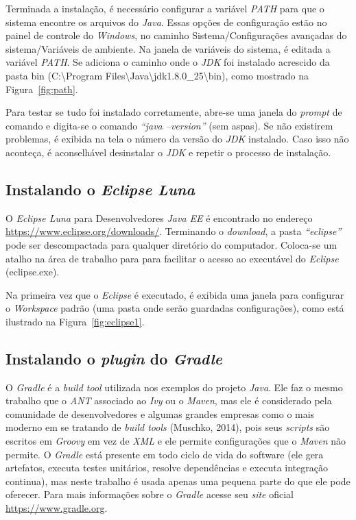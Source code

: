 Terminada a instalação, é necessário configurar a variável \textit{PATH} para que o sistema encontre os arquivos do \textit{Java}. Essas opções de configuração estão no painel de controle do \textit{Windows}, no caminho Sistema/Configurações avançadas do sistema/Variáveis de ambiente. Na janela de variáveis do sistema, é editada a variável \textit{PATH}. Se adiciona o caminho onde o \textit{JDK} foi instalado acrescido da pasta bin (C:\textbackslash Program Files\textbackslash Java\textbackslash jdk\textmd{1.8.0\_25}\textbackslash bin), como mostrado na Figura~\ref{fig:path}.


Para testar se tudo foi instalado corretamente, abre-se uma janela do \textit{prompt} de comando e digita-se o comando \textit{“java –version”} (sem aspas). Se não existirem problemas, é exibida na tela o número da versão do \textit{JDK} instalado. Caso isso não aconteça, é aconselhável desinstalar o \textit{JDK} e repetir o processo de instalação. 

\subsection{Instalando o \textit{Eclipse Luna}} 

O \textit{Eclipse Luna} para Desenvolvedores \textit{Java EE} é encontrado no endereço \url{https://www.eclipse.org/downloads/}. Terminando o \textit{download}, a pasta \textit{“eclipse”} pode ser descompactada para qualquer diretório do computador. Coloca-se um atalho na área de trabalho para  para facilitar o acesso ao executável do \textit{Eclipse} (eclipse.exe).

Na primeira vez que o \textit{Eclipse} é executado, é exibida uma janela para configurar o \textit{Workspace} padrão (uma pasta onde serão guardadas configurações), como está ilustrado na Figura~\ref{fig:eclipse1}.


\subsection{Instalando o \textit{plugin} do \textit{Gradle}} 

O \textit{Gradle} é a \textit{build tool} utilizada nos exemplos do projeto \textit{Java}. Ele faz o mesmo trabalho que o \textit{ANT} associado ao \textit{Ivy} ou o \textit{Maven}, mas ele é considerado pela comunidade de desenvolvedores e algumas grandes empresas como o mais moderno em se tratando de \textit{build tools} (Muschko, 2014), pois seus \textit{scripts} são escritos em \textit{Groovy} em vez de \textit{XML} e ele permite configurações que o \textit{Maven} não permite. O \textit{Gradle} está presente em todo ciclo de vida do software (ele gera artefatos, executa testes unitários, resolve dependências e executa integração continua), mas neste trabalho é usada apenas uma pequena parte do que ele pode oferecer. Para mais informações sobre o \textit{Gradle} acesse seu \textit{site} oficial \url{https://www.gradle.org}. 

